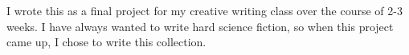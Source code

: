 \documentclass[main.tex]{subfiles}
\begin{document}
	I wrote this as a final project for my creative writing class over the course of 2-3 weeks.
	I have always wanted to write hard science fiction, so when this project came up, I chose to write this
	collection.
	
\end{document}
